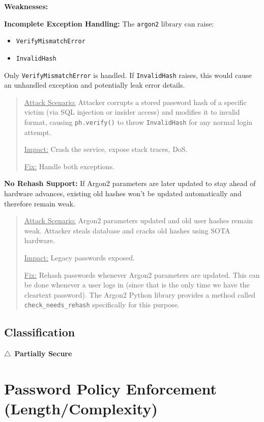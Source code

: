 \documentclass[11pt,a4paper]{article}
\newcommand{\partiallysecure}{\textcolor{warningorange}{$\triangle$~\textbf{Partially Secure}}}
\begin{document}
\textbf{Weaknesses:}

\textbf{Incomplete Exception Handling:} The \texttt{argon2} library can raise:
\begin{itemize}[noitemsep]
    \item \texttt{VerifyMismatchError}
    \item \texttt{InvalidHash}
\end{itemize}

Only \texttt{VerifyMismatchError} is handled. If \texttt{InvalidHash} raises, this would cause an unhandled exception and potentially leak error details.

\begin{quote}
\underline{Attack Scenario:} Attacker corrupts a stored password hash of a specific victim (via SQL injection or insider access) and modifies it to invalid format, causing \texttt{ph.verify()} to throw \texttt{InvalidHash} for any normal login attempt.

\underline{Impact:} Crash the service, expose stack traces, DoS.

\underline{Fix:} Handle both exceptions.
\end{quote}

\textbf{No Rehash Support:} If Argon2 parameters are later updated to stay ahead of hardware advances, existing old hashes won't be updated automatically and therefore remain weak.

\begin{quote}
\underline{Attack Scenario:} Argon2 parameters updated and old user hashes remain weak. Attacker steals database and cracks old hashes using SOTA hardware.

\underline{Impact:} Legacy passwords exposed.

\underline{Fix:} Rehash passwords whenever Argon2 parameters are updated. This can be done whenever a user logs in (since that is the only time we have the cleartext password). The Argon2 Python library provides a method called \texttt{check\_needs\_rehash} specifically for this purpose.
\end{quote}

\subsection{Classification}
\partiallysecure

\newpage
\section{Password Policy Enforcement (Length/Complexity)}
\end{document}
